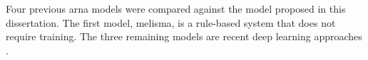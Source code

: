 
Four previous \gls{arna} models were compared against the
model proposed in this dissertation. The first model,
\gls{melisma}, is a rule-based system that does not require
training. The three remaining models are recent deep
learning approaches \parencite{chen2021attend,
micchi2021deep, mcleod2021modular}.

